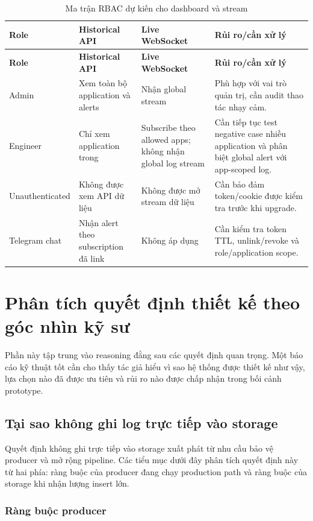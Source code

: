 \begin{longtable}{|P{2.8cm}|P{3.5cm}|P{4.0cm}|P{4.0cm}|}
\caption{Ma trận RBAC dự kiến cho dashboard và stream}
\label{tab:rbac-matrix}\\
\hline
\textbf{Role} & \textbf{Historical API} & \textbf{Live WebSocket} & \textbf{Rủi ro/cần xử lý} \\ \hline
\endfirsthead
\hline
\textbf{Role} & \textbf{Historical API} & \textbf{Live WebSocket} & \textbf{Rủi ro/cần xử lý} \\ \hline
\endhead
Admin & Xem toàn bộ application và alerts & Nhận global stream & Phù hợp với vai trò quản trị, cần audit thao tác nhạy cảm. \\ \hline
Engineer & Chỉ xem application trong  & Subscribe  theo allowed apps; không nhận global log stream & Cần tiếp tục test negative case nhiều application và phân biệt global alert với app-scoped log. \\ \hline
Unauthenticated & Không được xem API dữ liệu & Không được mở stream dữ liệu & Cần bảo đảm token/cookie được kiểm tra trước khi upgrade. \\ \hline
Telegram chat & Nhận alert theo subscription đã link & Không áp dụng & Cần kiểm tra token TTL, unlink/revoke và role/application scope. \\ \hline
\end{longtable}

\section{Phân tích quyết định thiết kế theo góc nhìn kỹ sư}

Phần này tập trung vào reasoning đằng sau các quyết định quan trọng. Một báo cáo kỹ thuật tốt cần cho thấy tác giả hiểu vì sao hệ thống được thiết kế như vậy, lựa chọn nào đã được ưu tiên và rủi ro nào được chấp nhận trong bối cảnh prototype.

\subsection{Tại sao không ghi log trực tiếp vào storage}

Quyết định không ghi trực tiếp vào storage xuất phát từ nhu cầu bảo vệ producer và mở rộng pipeline. Các tiểu mục dưới đây phân tích quyết định này từ hai phía: ràng buộc của producer đang chạy production path và ràng buộc của storage khi nhận lượng insert lớn.
\subsubsection{Ràng buộc producer}

